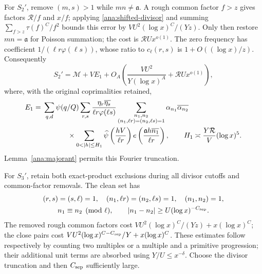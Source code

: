 For $S_2'$, remove $(m,s)>1$ while $mn\ne \mathfrak{a}$. A rough common factor
$f>z$ gives factors $\mathcal R/f$ and $x/f$; applying
\eqref{ana:shifted-divisor} and summing
$\sum_{f>z}\tau(f)^C/f^2$ bounds this error by
$VU^2(\log x)^C/(Yz)$. Only then restore $mn=\mathfrak{a}$ for Poisson summation;
the cost is $\mathcal RUx^{o(1)}$. The zero frequency has coefficient
$1/(\ell r\varphi(\ell s))$, whose ratio to $c_\ell(r,s)$ is
$1+O((\log x)/z)$. Consequently
\begin{equation}
 S_2'=\mathcal M+VE_1+
 O_A\left(\frac{VU^2}{Y(\log x)^A}+\mathcal RUx^{o(1)}\right),
 \label{ana:cross}
\end{equation}
where, with the original coprimalities retained,
\begin{align}
 E_1={}&\sum_{q,d}\psi(q/Q)\sum_{r,s}
     \frac{\eta_r\overline{\eta_s}}{\ell r\varphi(\ell s)}
 \sum_{\substack{n_1,n_2\\(n_1,\ell r)=(n_2,\ell s)=1}}
       \alpha_{n_1}\overline{\alpha_{n_2}}\notag\\
 &\hspace{12mm}\times
 \sum_{0<|h|\le H_1}\widehat\psi\left(\frac{hV}{\ell r}\right)
               e\left(\frac{\mathfrak{a}h\overline{n_1}}{\ell r}\right),
 \qquad H_1\asymp\frac{Y\mathcal R}{V}(\log x)^5.
 \label{ana:E1-definition}
\end{align}
Lemma~\ref{ana:majorant} permits this Fourier truncation.

For $S_3'$, retain both exact-product exclusions during all divisor
cutoffs and common-factor removals. The clean set has
\begin{equation}
 \begin{gathered}
 (r,s)=(s,\ell)=1,\quad (n_1,\ell r)=(n_2,\ell s)=1,
 \quad(n_1,n_2)=1,\\
 n_1\equiv n_2\pmod\ell,\qquad
 |n_1-n_2|\ge U(\log x)^{-C_{\rm sep}}.
 \end{gathered}
 \label{ana:clean-set}
\end{equation}
The removed rough common factors cost
$VU^2(\log x)^C/(Yz)+x(\log x)^C$; the close pairs cost
$VU^2(\log x)^{C-C_{\rm sep}}/Y+x(\log x)^C$.
These estimates follow respectively by counting two multiples or a
multiple and a primitive progression; their additional unit terms are
absorbed using $Y/U\le x^{-\delta}$. Choose the divisor truncation and
then $C_{\rm sep}$ sufficiently large.

